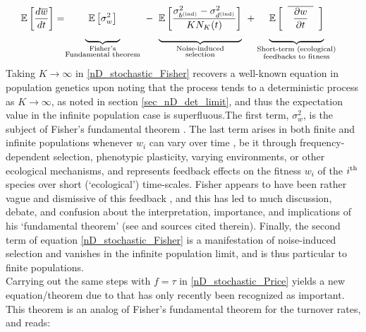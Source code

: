\begin{align}
\label{nD_stochastic_Fisher}
\mathbb{E}\left[\frac{d\overline{w}}{dt}\right] &= 
\negmedspace {\underbrace{\mystrut{4ex} \ \vphantom{ \frac{\sigma^2_{b^{\textrm{(ind)}}} - \sigma^2_{d^{\textrm{(ind)}}}}{KN_K(t)} } \mathbb{E}\left[\sigma^2_{w}\right] \ }_{\substack{\text{Fisher's} \\ \text{Fundamental theorem}}}} \ - \ {\underbrace{\mystrut{4ex}\mathbb{E}\left[\frac{\sigma^2_{b^{\textrm{(ind)}}} - \sigma^2_{d^{\textrm{(ind)}}}}{KN_K(t)}\right]}_{\substack{\text{Noise-induced} \\ \text{selection}}}} \ + {\underbrace{\mystrut{4ex} \vphantom{ \frac{\sigma^2_{b^{\textrm{(ind)}}} - \sigma^2_{d^{\textrm{(ind)}}}}{KN_K(t)} } \mathbb{E}\left[\hphantom{a}\overline{\hphantom{a}\frac{\partial w}{\partial t}\hphantom{a}}\hphantom{a}\right]}_{\substack{\text{Short-term (ecological)} \\ \text{feedbacks to fitness}}}}
\end{align}
Taking $K \to \infty$ in \eqref{nD_stochastic_Fisher} recovers a well-known equation in population genetics upon noting that the process tends to a deterministic process as $K \to \infty$, as noted in section \ref{sec_nD_det_limit}, and thus the expectation value in the infinite population case is superfluous.The first term, $\sigma^2_w$, is the subject of Fisher's fundamental theorem \citep{fisher_genetical_1930,  price_fishers_1972, frank_fishers_1992, kokko_stagnation_2021}. The last term arises in both finite and infinite populations whenever $w_i$ can vary over time \citep{baez_fundamental_2021}, be it through frequency-dependent selection, phenotypic plasticity, varying environments, or other ecological mechanisms, and represents feedback effects on the fitness $w_i$ of the $i\textsuperscript{th}$ species over short (`ecological') time-scales. Fisher appears to have been rather vague and dismissive of this feedback \citep{fisher_genetical_1930}, and this has led to much discussion, debate, and confusion about the interpretation, importance, and implications of his `fundamental theorem' (see \cite{kokko_stagnation_2021} and sources cited therein). Finally, the second term of equation \eqref{nD_stochastic_Fisher} is a manifestation of noise-induced selection and vanishes in the infinite population limit, and is thus particular to finite populations.\\
Carrying out the same steps with $f = \tau$ in \eqref{nD_stochastic_Price} yields a new equation/theorem due to \cite{kuosmanen_turnover_2022} that has only recently been recognized as important. This theorem is an analog of Fisher's fundamental theorem for the turnover rates, and reads:
